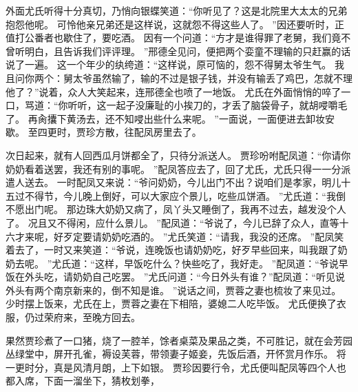 \par
外面尤氏听得十分真切，乃悄向银蝶笑道：“你听见了？这是北院里大太太的兄弟抱怨他呢。
可怜他亲兄弟还是这样说，这就怨不得这些人了。
”因还要听时，正值打公番者也歇住了，要吃酒。
因有一个问道：“方才是谁得罪了老舅，我们竟不曾听明白，且告诉我们评评理。
”邢德全见问，便把两个娈童不理输的只赶赢的话说了一遍。
这一个年少的纨绔道：“这样说，原可恼的，怨不得舅太爷生气。
我且问你两个：舅太爷虽然输了，输的不过是银子钱，并没有输丢了鸡巴，怎就不理他了？”说着，众人大笑起来，连邢德全也喷了一地饭。
尤氏在外面悄悄的啐了一口，骂道：“你听听，这一起子没廉耻的小挨刀的，才丢了脑袋骨子，就胡唚嚼毛了。
再肏攮下黄汤去，还不知唚出些什么来呢。
”一面说，一面便进去卸妆安歇。
至四更时，贾珍方散，往配凤房里去了。
\par
次日起来，就有人回西瓜月饼都全了，只待分派送人。
贾珍吩咐配凤道：“你请你奶奶看着送罢，我还有别的事呢。
”配凤答应去了，回了尤氏，尤氏只得一一分派遣人送去。
一时配凤又来说：“爷问奶奶，今儿出门不出？说咱们是孝家，明儿十五过不得节，今儿晚上倒好，可以大家应个景儿，吃些瓜饼酒。
”尤氏道：“我倒不愿出门呢。
那边珠大奶奶又病了，凤丫头又睡倒了，我再不过去，越发没个人了。
况且又不得闲，应什么景儿。
”配凤道：“爷说了，今儿已辞了众人，直等十六才来呢，好歹定要请奶奶吃酒的。
”尤氏笑道：“请我，我没的还席。
”配凤笑着去了，一时又来笑道：“爷说，连晚饭也请奶奶吃，好歹早些回来，叫我跟了奶奶去呢。
”尤氏道：“这样，早饭吃什么？快些吃了，我好走。
”配凤道：“爷说早饭在外头吃，请奶奶自己吃罢。
”尤氏问道：“今日外头有谁？”配凤道：“听见说外头有两个南京新来的，倒不知是谁。
”说话之间，贾蓉之妻也梳妆了来见过。
少时摆上饭来，尤氏在上，贾蓉之妻在下相陪，婆媳二人吃毕饭。
尤氏便换了衣服，仍过荣府来，至晚方回去。
\par
果然贾珍煮了一口猪，烧了一腔羊，馀者桌菜及果品之类，不可胜记，就在会芳园丛绿堂中，屏开孔雀，褥设芙蓉，带领妻子姬妾，先饭后酒，开怀赏月作乐。
将一更时分，真是风清月朗，上下如银。
贾珍因要行令，尤氏便叫配凤等四个人也都入席，下面一溜坐下，猜枚划拳，

